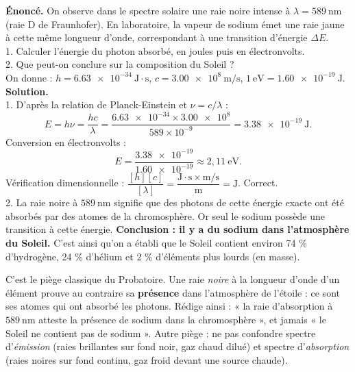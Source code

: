 \documentclass[11pt]{article}
\begin{document}
\begin{exoresolu}
\textbf{Énoncé.} On observe dans le spectre solaire une raie noire intense à $\lambda = 589\ \mathrm{nm}$ (raie D de Fraunhofer). En laboratoire, la vapeur de sodium émet une raie jaune à cette même longueur d'onde, correspondant à une transition d'énergie $\Delta E$.\\
1. Calculer l'énergie du photon absorbé, en joules puis en électronvolts.\\
2. Que peut-on conclure sur la composition du Soleil ?\\
On donne : $h = \num{6,63e-34}\ \mathrm{J \cdot s}$, $c = \num{3,00e8}\ \mathrm{m/s}$, $1\ \mathrm{eV} = \num{1,60e-19}\ \mathrm{J}$.
\tcblower
\textbf{Solution.}\\
1. D'après la relation de Planck-Einstein et $\nu = c/\lambda$ :
\[ E = h\nu = \frac{hc}{\lambda} = \frac{\num{6,63e-34}\times \num{3,00e8}}{589\times 10^{-9}} = \num{3,38e-19}\ \mathrm{J}. \]
Conversion en électronvolts :
\[ E = \frac{\num{3,38e-19}}{\num{1,60e-19}} \approx 2,11\ \mathrm{eV}. \]
Vérification dimensionnelle : $\dfrac{[h][c]}{[\lambda]} = \dfrac{\mathrm{J \cdot s}\times \mathrm{m/s}}{\mathrm{m}} = \mathrm{J}$. Correct.\\
2. La raie noire à $589\ \mathrm{nm}$ signifie que des photons de cette énergie exacte ont été absorbés par des atomes de la chromosphère. Or seul le sodium possède une transition à cette énergie. \textbf{Conclusion : il y a du sodium dans l'atmosphère du Soleil.} C'est ainsi qu'on a établi que le Soleil contient environ 74 \% d'hydrogène, 24 \% d'hélium et 2 \% d'éléments plus lourds (en masse).
\end{exoresolu}

\begin{attention}
C'est le piège classique du Probatoire. Une raie \emph{noire} à la longueur d'onde d'un élément prouve au contraire sa \textbf{présence} dans l'atmosphère de l'étoile : ce sont ses atomes qui ont absorbé les photons. Rédige ainsi : « la raie d'absorption à $589\ \mathrm{nm}$ atteste la présence de sodium dans la chromosphère », et jamais « le Soleil ne contient pas de sodium ». Autre piège : ne pas confondre spectre d'\emph{émission} (raies brillantes sur fond noir, gaz chaud dilué) et spectre d'\emph{absorption} (raies noires sur fond continu, gaz froid devant une source chaude).
\end{attention}
\end{document}
